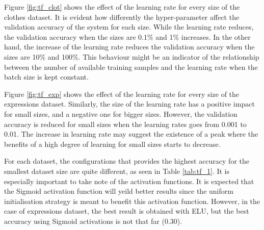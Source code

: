 \documentclass{article}
\begin{document}


Figure \ref{fig:tf_clot} shows the effect of the learning rate for every size of the clothes dataset. It is evident how differently the hyper-parameter affect the validation accuracy of the system for each size. While the learning rate reduces, the validation accuracy when the sizes are 0.1\% and 1\% increases. In the other hand, the increase of the learning rate reduces the validation accuracy when the sizes are 10\% and 100\%. This behaviour might be an indicator of the relationship between the number of available training samples and the learning rate when the batch size is kept constant.

Figure \ref{fig:tf_exp} shows the effect of the learning rate for every size of the expressions dataset. Similarly, the size of the learning rate has a positive impact for small sizes, and a negative one for bigger sizes. However, the validation accuracy is reduced for small sizes when the learning rates goes from 0.001 to 0.01. The increase in learning rate may suggest the existence of a peak where the benefits of a high degree of learning for small sizes starts to decrease.

For each dataset, the configurations that provides the highest accuracy for the smallest dataset size are quite different, as seen in Table \ref{tab:tf_1}. It is especially important to take note of the activation functions. It is expected that the Sigmoid activation function will yeild better results since the uniform initialisation strategy is meant to benefit this activation function. However, in the case of expressions dataset, the best result is obtained with ELU, but the best accuracy using Sigmoid activations is not that far (0.30).
\end{document}
